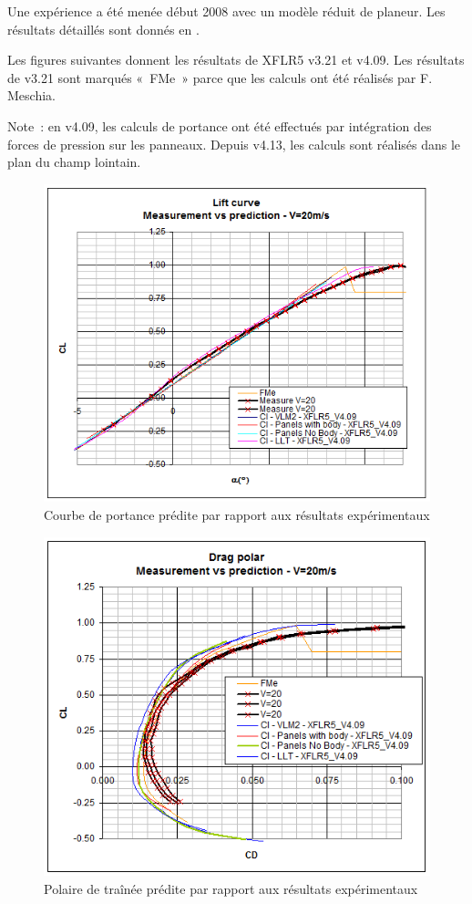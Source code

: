 \documentclass[a4paper,twoside,12pt,dvips]{article}
\begin{document}
Une expérience a été menée début 2008 avec un modèle réduit de planeur. Les 
résultats détaillés sont donnés en \cite{DeperroisResults}. 

Les figures suivantes donnent les résultats de XFLR5 v3.21 et v4.09. Les 
résultats de v3.21 sont marqués «~FMe~» parce que les calculs ont été
réalisés par F. Meschia.

Note~: en v4.09, les calculs de portance ont été effectués par intégration 
des forces de pression sur les panneaux. Depuis v4.13, les calculs sont
réalisés dans le plan du champ lointain. 

\begin{figure}[htbp]
  \centering
  \includegraphics[width=0.8\linewidth]{img-37}
  \caption{Courbe de portance prédite par rapport aux résultats expérimentaux}
  \label{img:courbe_portance_prédite_résultats_expérimentaux}
\end{figure}

\begin{figure}[htbp]
  \centering 
  \includegraphics[width=0.8\linewidth]{img-38}
  \caption{Polaire de traînée prédite par rapport aux résultats expérimentaux}
  \label{img:polaire_traînée_prédite_résultats_expérimentaux}
\end{figure}
\end{document}

